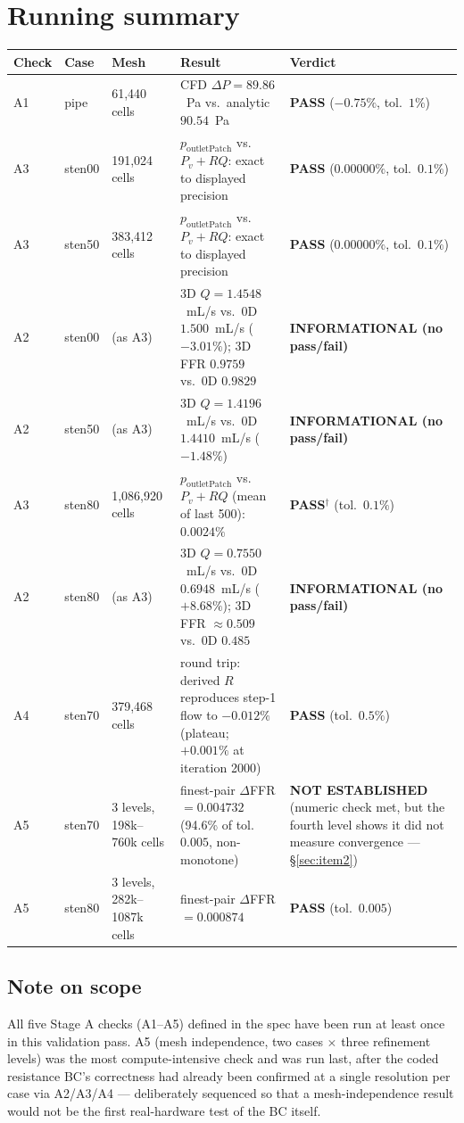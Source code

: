 \documentclass[11pt]{article}
\newcommand{\PASS}{\textcolor{passgreen}{\textbf{PASS}}}
\newcommand{\INFO}{\textcolor{pendingblue}{\textbf{INFORMATIONAL (no pass/fail)}}}
\newcommand{\NOTEST}{\textcolor{failred}{\textbf{NOT ESTABLISHED}}}
\begin{document}
\section{Running summary}
\label{sec:summary}
\begin{longtable}{p{1.0cm}p{1.6cm}p{2.4cm}p{5.4cm}p{3.4cm}}
\toprule
Check & Case & Mesh & Result & Verdict \\
\midrule
\endhead
A1 & pipe & 61{,}440 cells & CFD $\Delta P = 89.86$~Pa vs.\ analytic $90.54$~Pa & \PASS{} ($-0.75\%$, tol.\ $1\%$) \\
A3 & sten00 & 191{,}024 cells & $p_{\text{outletPatch}}$ vs.\ $P_v+RQ$: exact to displayed precision & \PASS{} ($0.00000\%$, tol.\ $0.1\%$) \\
A3 & sten50 & 383{,}412 cells & $p_{\text{outletPatch}}$ vs.\ $P_v+RQ$: exact to displayed precision & \PASS{} ($0.00000\%$, tol.\ $0.1\%$) \\
A2 & sten00 & (as A3) & 3D $Q=1.4548$~mL/s vs.\ 0D $1.500$~mL/s ($-3.01\%$); 3D FFR $0.9759$ vs.\ 0D $0.9829$ & \INFO{} \\
A2 & sten50 & (as A3) & 3D $Q=1.4196$~mL/s vs.\ 0D $1.4410$~mL/s ($-1.48\%$) & \INFO{} \\
A3 & sten80 & 1{,}086{,}920 cells & $p_{\text{outletPatch}}$ vs.\ $P_v+RQ$ (mean of last 500): $0.0024\%$ & \PASS{}$^\dagger$ (tol.\ $0.1\%$) \\
A2 & sten80 & (as A3) & 3D $Q=0.7550$~mL/s vs.\ 0D $0.6948$~mL/s ($+8.68\%$); 3D FFR $\approx0.509$ vs.\ 0D $0.485$ & \INFO{} \\
A4 & sten70 & 379{,}468 cells & round trip: derived $R$ reproduces step-1 flow to $-0.012\%$ (plateau; $+0.001\%$ at iteration 2000) & \PASS{} (tol.\ $0.5\%$) \\
A5 & sten70 & 3 levels, 198k--760k cells & finest-pair $\Delta$FFR $=0.004732$ (94.6\% of tol.\ $0.005$, non-monotone) & \NOTEST{} (numeric check met, but the fourth level shows it did not measure convergence --- \S\ref{sec:item2}) \\
A5 & sten80 & 3 levels, 282k--1087k cells & finest-pair $\Delta$FFR $=0.000874$ & \PASS{} (tol.\ $0.005$) \\
\bottomrule
\end{longtable}

\subsection*{Note on scope}
\label{sec:scope-note}
All five Stage A checks (A1--A5) defined in the spec have been run at least once in this validation
pass. A5 (mesh independence, two cases $\times$ three refinement levels) was the most
compute-intensive check and was run last, after the coded resistance BC's correctness had already
been confirmed at a single resolution per case via A2/A3/A4 --- deliberately sequenced so that a
mesh-independence result would not be the first real-hardware test of the BC itself.
\end{document}
